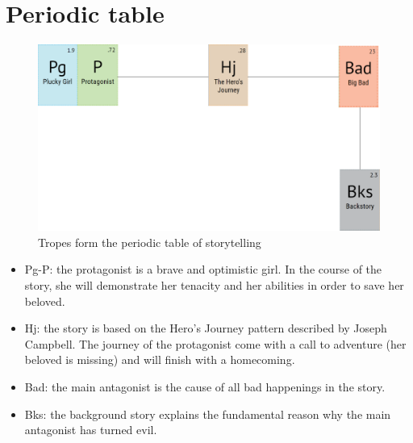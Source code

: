 \section{Periodic table}

\begin{figure}[H]
  \centering
  \includegraphics[width=14cm]{Images/Diagrams/periodicTable}
  \caption{Tropes form the periodic table of storytelling}
\end{figure}

\begin{itemize}
\item Pg-P: the protagonist is a brave and optimistic girl. In the course of the story, she will demonstrate her tenacity and her abilities in order to save her beloved.

\item Hj: the story is based on the Hero's Journey pattern described by Joseph Campbell. The journey of the protagonist come with a call to adventure (her beloved is missing) and will finish with a homecoming.

\item Bad: the main antagonist is the cause of all bad happenings in the story.

\item Bks: the background story explains the fundamental reason why the main antagonist has turned evil.
\end{itemize}

